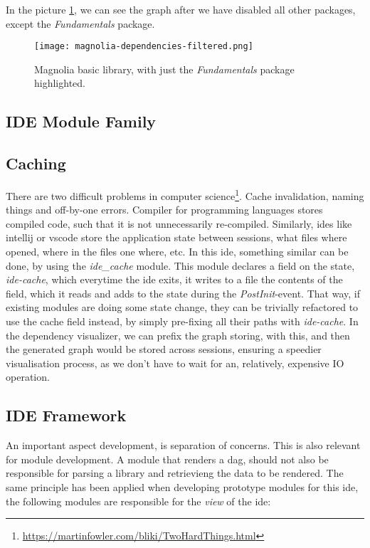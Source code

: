 In the picture \ref{pic:depDis}, we can see the graph after we have disabled all
other packages, except the \textit{Fundamentals} package.

\begin{figure}
  \centering
  \texttt{[image: magnolia-dependencies-filtered.png]}
  \caption{
    Magnolia basic library, with just the \textit{Fundamentals} package
    highlighted.
  }
  \label{pic:depDis}
\end{figure}

\subsection{IDE Module Family}

\subsection{Caching}

There are two difficult problems in computer science\footnote{\url{https://martinfowler.com/bliki/TwoHardThings.html}}.
Cache invalidation, naming things and off-by-one errors. Compiler for
programming languages stores compiled code, such that it is not unnecessarily
re-compiled. Similarly, \gls{ide}s like \gls{intellij} or \gls{vscode} store the
application state between sessions, what files where opened, where in the files
one where, etc. In this \gls{ide}, something similar can be done, by using the
\textit{ide\_cache} module. This module declares a field on the state,
\textit{ide-cache}, which everytime the \gls{ide} exits, it writes to a file the
contents of the field, which it reads and adds to the state during the
\textit{PostInit}-event. That way, if existing modules are doing some state
change, they can be trivially refactored to use the cache field instead, by
simply pre-fixing all their paths with \textit{ide-cache}. In the dependency
visualizer, we can prefix the graph storing, with this, and then the generated
graph would be stored across sessions, ensuring a speedier visualisation
process, as we don't have to wait for an, relatively, expensive IO operation.

\subsection{IDE Framework}

An important aspect development, is separation of concerns. This is also
relevant for module development. A module that renders a \gls{dag}, should not
also be responsible for parsing a library and retrievieng the data to be
rendered. The same principle has been applied when developing prototype modules
for this \gls{ide}, the following modules are responsible for the \textit{view}
of the \gls{ide}:

